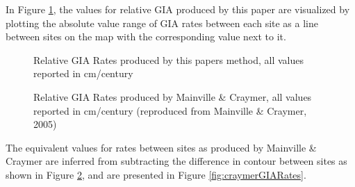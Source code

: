 
In Figure \ref{fig:myGIARates}, the values for relative GIA produced by this paper are
visualized by plotting the absolute value range of GIA rates between each site
as a line between sites on the map with the corresponding value next to it.

\begin{figure}[h]
	\caption{Relative GIA Rates produced by this papers method, all values reported in cm/century}
	\label{fig:myGIARates}
\end{figure}
\newpage
\begin{figure}[h]
	\caption{Relative GIA Rates produced by Mainville \& Craymer, all values reported in cm/century (reproduced from Mainville \& Craymer, 2005)}
	\label{fig:craymerGIARatesBigPlot}
\end{figure}

The equivalent values for rates between sites as produced by Mainville \& Craymer
are inferred from subtracting the difference in contour between sites as shown in
Figure \ref{fig:craymerGIARatesBigPlot}, and are presented in Figure \ref{fig:craymerGIARates}.

